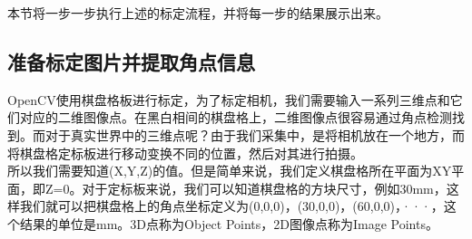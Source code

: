 \documentclass[]{article}
\begin{document}
    本节将一步一步执行上述的标定流程，并将每一步的结果展示出来。
    \subsection{准备标定图片并提取角点信息}
    OpenCV使用棋盘格板进行标定，为了标定相机，我们需要输入一系列三维点和它们对应的二维图像点。在黑白相间的棋盘格上，二维图像点很容易通过角点检测找到。而对于真实世界中的三维点呢？由于我们采集中，是将相机放在一个地方，而将棋盘格定标板进行移动变换不同的位置，然后对其进行拍摄。\\
    
    所以我们需要知道(X,Y,Z)的值。但是简单来说，我们定义棋盘格所在平面为XY平面，即Z=0。对于定标板来说，我们可以知道棋盘格的方块尺寸，例如30mm，这样我们就可以把棋盘格上的角点坐标定义为(0,0,0)，(30,0,0)，(60,0,0)，···，这个结果的单位是mm。3D点称为Object Points，2D图像点称为Image Points。
\end{document}
